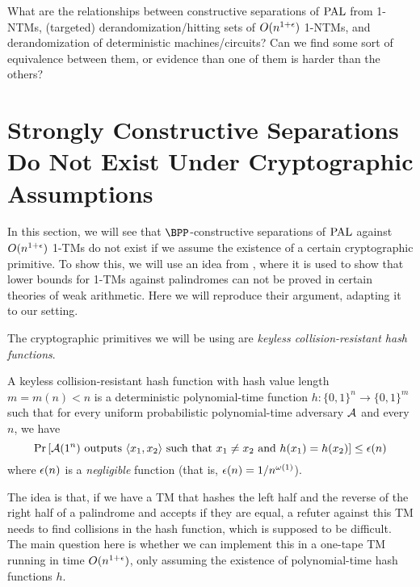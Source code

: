 \begin{question}
    What are the relationships between constructive separations of $\mathrm{PAL}$ from 1-NTMs, (targeted) derandomization/hitting sets
    of $O(n^{1+\epsilon})$ 1-NTMs, and derandomization of deterministic machines/circuits? 
    Can we find some sort of equivalence between them, or evidence than one of them is harder than the others? 
\end{question}




\section{Strongly Constructive Separations Do Not Exist Under Cryptographic Assumptions}
\label{sec:cryptotm}

In this section, we will see that $\BPP$-constructive separations of $\mathrm{PAL}$ against $O(n^{1+\epsilon})$ 1-TMs do not exist if we assume
the existence of a certain cryptographic primitive. To show this, we will use an idea from \cite{Oliveira24}, where it is used 
to show that lower bounds for 1-TMs against palindromes can not be proved in certain theories of weak arithmetic. Here we 
will reproduce their argument, adapting it to our setting.

The cryptographic primitives we will be using are \emph{keyless collision-resistant hash functions}.

\begin{definition} A keyless collision-resistant hash
function with hash value length $m = m(n) < n$ is a deterministic polynomial-time
function $h \colon \{0, 1\}^n \to \{0, 1\}^m$ such that for every uniform probabilistic polynomial-time adversary
$\mathcal{A}$ and every $n$, we have
$$\text{Pr}\left[\mathcal{A}(1^n)  \text{ outputs } \langle x_1, x_2 \rangle \text{ such that } x_1 \neq x_2 \text{ and } h(x_1) = h(x_2)\right] \leq \epsilon(n)$$ 
where $\epsilon(n)$ is a \emph{negligible} function (that is, $\epsilon(n) = 1/n^{\omega(1)}$).
\end{definition}

The idea is that, if we have a TM that hashes the left half and the reverse of the right half of a palindrome and accepts if they are equal, a
refuter against this TM needs to find collisions in the hash function, which is supposed to be difficult. The main question here is whether
we can implement this in a one-tape TM running in time $O(n^{1+\epsilon})$, only assuming the existence of polynomial-time hash functions $h$.

